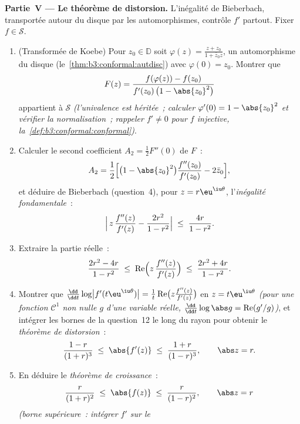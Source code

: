 \begin{problem}
\medskip
\noindent\textbf{Partie~V --- Le théorème de distorsion.}
L'inégalité de Bieberbach, transportée autour du disque par
les automorphismes, contrôle $f'$ partout. Fixer $f \in
\mathcal S$.
\begin{enumerate}[resume]
  \item (Transformée de Koebe) Pour $z_0 \in \mathbb D$
        soit $\varphi(z) = \frac{z + z_0}{1 + \bar
        z_0z}$, un automorphisme du disque
        (le~\cref{thm:b3:conformal:autdisc}) avec
        $\varphi(0) = z_0$. Montrer que
        \[
        F(z) = \frac{f(\varphi(z)) - f(z_0)}
        {f'(z_0)\,\bigl(1 - \abs{z_0}^2\bigr)}
        \]
        appartient à $\mathcal S$ \emph{(l'univalence est
        héritée~; calculer $\varphi'(0) = 1 - \abs{z_0}^2$
        et vérifier la normalisation~; rappeler $f' \neq 0$
        pour $f$ injective,
        la~\cref{def:b3:conformal:conformal})}.
  \item Calculer le second coefficient $A_2 =
        \frac12F''(0)$ de $F$~:
        \[
        A_2 = \frac12\Bigl[\bigl(1 - \abs{z_0}^2\bigr)
        \frac{f''(z_0)}{f'(z_0)} - 2\bar z_0\Bigr] ,
        \]
        et déduire de Bieberbach (question~4), pour $z =
        r\eu^{\iu\theta}$, l'\emph{inégalité
        fondamentale}~:
        \[
        \Bigl|\,z\,\frac{f''(z)}{f'(z)} -
        \frac{2r^2}{1 - r^2}\Bigr|
        \;\leq\; \frac{4r}{1 - r^2} .
        \]
  \item Extraire la partie réelle~:
        \[
        \frac{2r^2 - 4r}{1 - r^2} \;\leq\;
        \operatorname{Re}\Bigl(z\,\frac{f''(z)}{f'(z)}\Bigr)
        \;\leq\; \frac{2r^2 + 4r}{1 - r^2} .
        \]
  \item Montrer que $\frac{\dd}{\dd t}\log\bigl|
        f'(t\eu^{\iu\theta})\bigr| = \frac1t
        \operatorname{Re}\bigl(z\frac{f''(z)}{f'(z)}\bigr)$
        en $z = t\eu^{\iu\theta}$ \emph{(pour une fonction
        $\mathcal C^1$ non nulle $g$ d'une variable réelle,
        $\frac{\dd}{\dd t}\log\abs g =
        \operatorname{Re}(g'/g)$)}, et intégrer les bornes
        de la question~12 le long du rayon pour obtenir le
        \emph{théorème de distorsion}~:
        \[
        \frac{1 - r}{(1 + r)^3} \;\leq\; \abs{f'(z)}
        \;\leq\; \frac{1 + r}{(1 - r)^3},
        \qquad \abs z = r .
        \]
  \item En déduire le \emph{théorème de croissance}~:
        \[
        \frac{r}{(1 + r)^2} \;\leq\; \abs{f(z)} \;\leq\;
        \frac{r}{(1 - r)^2},
        \qquad \abs z = r
        \]
        \emph{(borne supérieure~: intégrer $f'$ sur le
}
\end{enumerate}
\end{problem}
